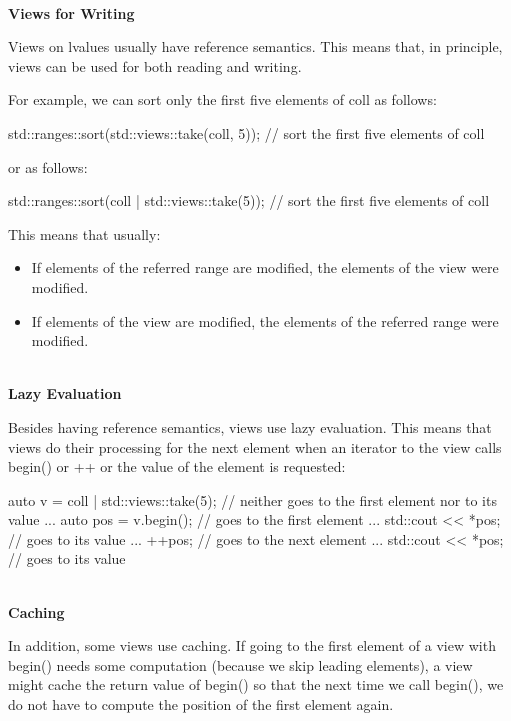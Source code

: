 \noindent
\hspace*{\fill} \\ %
\textbf{Views for Writing}

Views on lvalues usually have reference semantics. This means that, in principle, views can be used for both reading and writing.

For example, we can sort only the first five elements of coll as follows:

\begin{cpp}
std::ranges::sort(std::views::take(coll, 5)); // sort the first five elements of coll
\end{cpp}

or as follows:

\begin{cpp}
std::ranges::sort(coll | std::views::take(5)); // sort the first five elements of coll
\end{cpp}

This means that usually:

\begin{itemize}
\item
If elements of the referred range are modified, the elements of the view were modified.

\item
If elements of the view are modified, the elements of the referred range were modified.
\end{itemize}

\noindent
\hspace*{\fill} \\ %
\textbf{Lazy Evaluation}

Besides having reference semantics, views use lazy evaluation. This means that views do their processing for the next element when an iterator to the view calls begin() or ++ or the value of the element is requested:

\begin{cpp}
auto v = coll | std::views::take(5); // neither goes to the first element nor to its value
...
auto pos = v.begin(); // goes to the first element
...
std::cout << *pos; // goes to its value
...
++pos; // goes to the next element
...
std::cout << *pos; // goes to its value
\end{cpp}

\noindent
\hspace*{\fill} \\ %
\textbf{Caching}

In addition, some views use caching. If going to the first element of a view with begin() needs some computation (because we skip leading elements), a view might cache the return value of begin() so that the next time we call begin(), we do not have to compute the position of the first element again.

